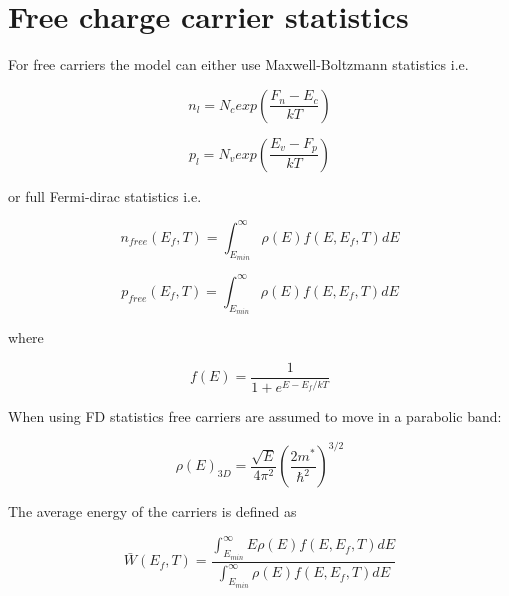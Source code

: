 \section{Free charge carrier statistics}
For free carriers the model can either use Maxwell-Boltzmann statistics i.e.

\begin{equation}
n_{l}=N_c exp \left (\frac{F_n-E_{c}}{kT} \right)
\end{equation}

\begin{equation}
p_{l}=N_v exp \left(\frac{E_{v}-F_p}{kT} \right)
\end{equation}


or full Fermi-dirac statistics i.e.

\begin{equation}
n_{free}(E_{f},T)=\int^{\infty}_{E_{min}} \rho(E) f(E,E_{f},T) dE
\end{equation}

\begin{equation}
p_{free}(E_{f},T)=\int^{\infty}_{E_{min}} \rho(E) f(E,E_{f},T) dE
\end{equation}

where

\begin{equation}
f(E)=\frac{1}{1+e^{{E-E_f}/kT}}
\end{equation}

When using FD statistics free carriers are assumed to move in a parabolic band:

\begin{equation}
\rho(E)_{3D}=\frac{\sqrt{E}}{4\pi^2} \left ( \frac{2m^{*}}{\hbar^2}\right )^{3/2}
\end{equation}

The average energy of the carriers is defined as

\begin{equation}
\label{eq:energy}
\bar{W}(E_{f},T)=\frac{\int^{\infty}_{E_{min}} E \rho(E) f(E,E_{f},T) dE}{\int^{\infty}_{E_{min}} \rho(E) f(E,E_{f},T) dE}
\end{equation}













